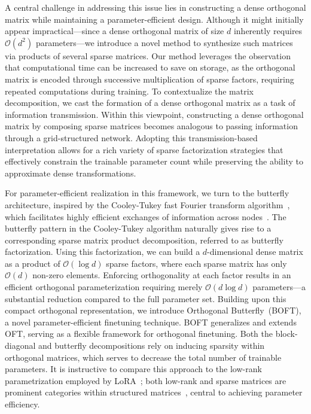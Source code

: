 A central challenge in addressing this issue lies in constructing a dense orthogonal matrix while maintaining a parameter-efficient design. Although it might initially appear impractical—since a dense orthogonal matrix of size $d$ inherently requires $\mathcal{O}(d^2)$ parameters—we introduce a novel method to synthesize such matrices via products of several sparse matrices. Our method leverages the observation that computational time can be increased to save on storage, as the orthogonal matrix is encoded through successive multiplication of sparse factors, requiring repeated computations during training. To contextualize the matrix decomposition, we cast the formation of a dense orthogonal matrix as a task of information transmission. Within this viewpoint, constructing a dense orthogonal matrix by composing sparse matrices becomes analogous to passing information through a grid-structured network. Adopting this transmission-based interpretation allows for a rich variety of sparse factorization strategies that effectively constrain the trainable parameter count while preserving the ability to approximate dense transformations.

For parameter-efficient realization in this framework, we turn to the butterfly architecture, inspired by the Cooley-Tukey fast Fourier transform algorithm~\cite{cooley1965algorithm}, which facilitates highly efficient exchanges of information across nodes~\cite{klasing1994broadcasting}. The butterfly pattern in the Cooley-Tukey algorithm naturally gives rise to a corresponding sparse matrix product decomposition, referred to as butterfly factorization. Using this factorization, we can build a $d$-dimensional dense matrix as a product of $\mathcal{O}(\log d)$ sparse factors, where each sparse matrix has only $\mathcal{O}(d)$ non-zero elements. Enforcing orthogonality at each factor results in an efficient orthogonal parameterization requiring merely $\mathcal{O}(d\log d)$ parameters—a substantial reduction compared to the full parameter set. Building upon this compact orthogonal representation, we introduce Orthogonal Butterfly~(BOFT), a novel parameter-efficient finetuning technique. BOFT generalizes and extends OFT, serving as a flexible framework for orthogonal finetuning. Both the block-diagonal and butterfly decompositions rely on inducing sparsity within orthogonal matrices, which serves to decrease the total number of trainable parameters. It is instructive to compare this approach to the low-rank parametrization employed by LoRA~\cite{hulora2022}; both low-rank and sparse matrices are prominent categories within structured matrices~\cite{candes2011robust}, central to achieving parameter efficiency.

